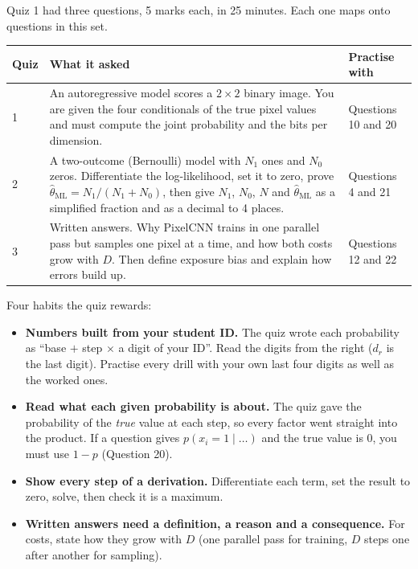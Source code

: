 \documentclass[12pt,a4paper]{article}
\begin{document}
Quiz 1 had three questions, 5 marks each, in 25 minutes. Each one maps onto questions in this set.

\begin{center}
\begin{tabular}{@{}l>{\raggedright\arraybackslash}p{}>{\raggedright\arraybackslash}p{}@{}}
\toprule
Quiz & What it asked & Practise with \\
\midrule
1 & An autoregressive model scores a $2\times2$ binary image. You are given the four conditionals of the true pixel values and must compute the joint probability and the bits per dimension. & Questions 10 and 20 \\
2 & A two-outcome (Bernoulli) model with $N_1$ ones and $N_0$ zeros. Differentiate the log-likelihood, set it to zero, prove $\hat\theta_{\text{ML}}=N_1/(N_1+N_0)$, then give $N_1$, $N_0$, $N$ and $\hat\theta_{\text{ML}}$ as a simplified fraction and as a decimal to 4 places. & Questions 4 and 21 \\
3 & Written answers. Why PixelCNN trains in one parallel pass but samples one pixel at a time, and how both costs grow with $D$. Then define exposure bias and explain how errors build up. & Questions 12 and 22 \\
\bottomrule
\end{tabular}
\end{center}

Four habits the quiz rewards:
\begin{itemize}[nosep]
  \item \textbf{Numbers built from your student ID.} The quiz wrote each probability as ``base $+$ step $\times$ a digit of your ID''. Read the digits from the right ($d_r$ is the last digit). Practise every drill with your own last four digits as well as the worked ones.
  \item \textbf{Read what each given probability is about.} The quiz gave the probability of the \emph{true} value at each step, so every factor went straight into the product. If a question gives $p(x_i=1\mid\dots)$ and the true value is 0, you must use $1-p$ (Question 20).
  \item \textbf{Show every step of a derivation.} Differentiate each term, set the result to zero, solve, then check it is a maximum.
  \item \textbf{Written answers need a definition, a reason and a consequence.} For costs, state how they grow with $D$ (one parallel pass for training, $D$ steps one after another for sampling).
\end{itemize}
\end{document}
